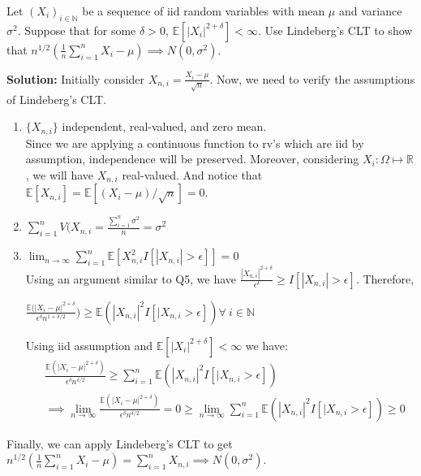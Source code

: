 \documentclass[11pt,letterpaper]{article}                  %
\begin{document}
\bigskip

\begin{problem}
Let $(X_i)_{i \in \mathbb{N}}$ be a sequence of iid random variables with mean $\mu$ and variance $\sigma^2$. Suppose that for some $\delta>0$, $\mathbb{E}\left[|X_i|^{2+\delta}\right]<\infty$. Use Lindeberg's CLT to show that $n^{1/2}(\frac{1}{n}\sum_{i=1}^{n} X_i - \mu) \implies N(0,\sigma^2)$.

\textbf{Solution:}
Initially consider $X_{n,i} = \frac{X_i - \mu}{\sqrt{n}}$. Now, we need to verify the assumptions of Lindeberg's CLT.
\begin{enumerate}
\item $\{X_{n,i}\}$ independent, real-valued, and zero mean. \\
Since we are applying a continuous function to rv's which are iid by assumption, independence will be preserved. Moreover, considering $X_i:\Omega \mapsto \mathbb{R}$, we will have $X_{n,i}$ real-valued. And notice that $\mathbb{E}[X_{n,i}] = \mathbb{E}[(X_i - \mu)/\sqrt{n}] = 0$.\\ 
\item $\sum_{i=1}^n V(X_{n,i} = \frac{\sum_{i=1}^n \sigma^2}{n} = \sigma^2$
\item $\lim_{n \to \infty} \sum_{i=1}^n \mathbb{E}[X_{n,i}^2 I[|X_{n,i}|>\epsilon]] =0$\\
Using an argument similar to Q5, we have $\frac{|X_{n,i}|^{2+\delta}}{\epsilon^{\delta}} \geq I[|X_{n,i}|>\epsilon]$. Therefore,
\begin{center}
$\frac{\mathbb{E}(|X_i - \mu|^{2+\delta}}{\epsilon^{\delta} n^{1+\delta/2}}) \geq \mathbb{E}(|X_{n,i}|^2 I[|X_{n,i}>\epsilon]) \forall \ i \in \mathbb{N}$
\end{center}
Using iid assumption and $\mathbb{E}\left[|X_i|^{2+\delta}\right]<\infty$ we have:
\begin{align*}
&\frac{\mathbb{E}(|X_i-\mu|^{2+\delta})}{\epsilon^{\delta}n^{\delta/2}}\geq \sum_{i=1}^n \mathbb{E}(|X_{n,i}|^2 I[|X_{n,i}>\epsilon])\\
&\implies \lim_{n \to \infty} \frac{\mathbb{E}(|X_i-\mu|^{2+\delta})}{\epsilon^{\delta}n^{\delta/2}} =0 \geq \lim_{n \to \infty} \sum_{i=1}^n \mathbb{E}(|X_{n,i}|^2 I[|X_{n,i}>\epsilon]) \geq 0
\end{align*}
\end{enumerate}
Finally, we can apply Lindeberg's CLT to get $n^{1/2}(\frac{1}{n}\sum_{i=1}^{n} X_i - \mu) = \sum_{i=1}^n X_{n,i} \implies N(0,\sigma^2)$.
\end{problem}
\end{document}
